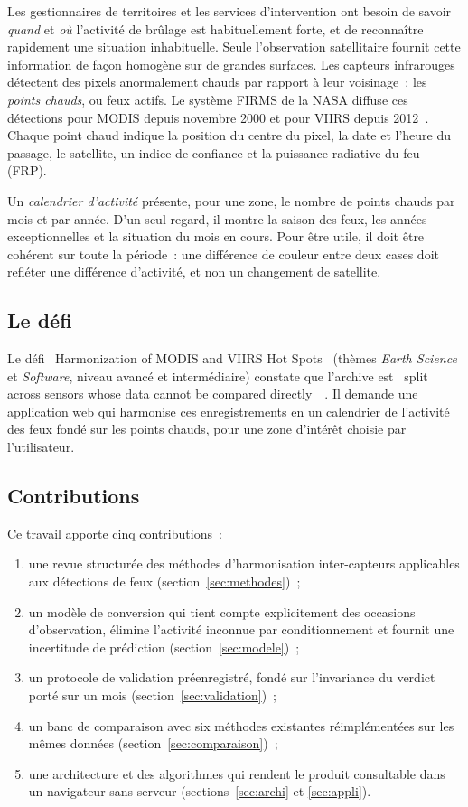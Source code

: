 \documentclass[11pt,a4paper]{article}
\newcommand{\og}{\guillemotleft~}
\newcommand{\fg}{~\guillemotright}
\begin{document}
Les gestionnaires de territoires et les services d'intervention ont besoin de savoir \emph{quand} et \emph{où} l'activité de brûlage est habituellement forte, et de reconnaître rapidement une situation inhabituelle. Seule l'observation satellitaire fournit cette information de façon homogène sur de grandes surfaces. Les capteurs infrarouges détectent des pixels anormalement chauds par rapport à leur voisinage~: les \emph{points chauds}, ou feux actifs. Le système FIRMS de la NASA diffuse ces détections pour MODIS depuis novembre 2000 et pour VIIRS depuis 2012~\cite{firms}. Chaque point chaud indique la position du centre du pixel, la date et l'heure du passage, le satellite, un indice de confiance et la puissance radiative du feu (FRP).

Un \emph{calendrier d'activité} présente, pour une zone, le nombre de points chauds par mois et par année. D'un seul regard, il montre la saison des feux, les années exceptionnelles et la situation du mois en cours. Pour être utile, il doit être cohérent sur toute la période~: une différence de couleur entre deux cases doit refléter une différence d'activité, et non un changement de satellite.

\subsection{Le défi}

Le défi \og Harmonization of MODIS and VIIRS Hot Spots\fg{} (thèmes \emph{Earth Science} et \emph{Software}, niveau avancé et intermédiaire) constate que l'archive est \og split across sensors whose data cannot be compared directly\fg~\cite{spaceapps2026}. Il demande une application web qui harmonise ces enregistrements en un calendrier de l'activité des feux fondé sur les points chauds, pour une zone d'intérêt choisie par l'utilisateur.

\subsection{Contributions}

Ce travail apporte cinq contributions~:
\begin{enumerate}
  \item une revue structurée des méthodes d'harmonisation inter-capteurs applicables aux détections de feux (section~\ref{sec:methodes})~;
  \item un modèle de conversion qui tient compte explicitement des occasions d'observation, élimine l'activité inconnue par conditionnement et fournit une incertitude de prédiction (section~\ref{sec:modele})~;
  \item un protocole de validation préenregistré, fondé sur l'invariance du verdict porté sur un mois (section~\ref{sec:validation})~;
  \item un banc de comparaison avec six méthodes existantes réimplémentées sur les mêmes données (section~\ref{sec:comparaison})~;
  \item une architecture et des algorithmes qui rendent le produit consultable dans un navigateur sans serveur (sections~\ref{sec:archi} et \ref{sec:appli}).
\end{enumerate}
\end{document}

